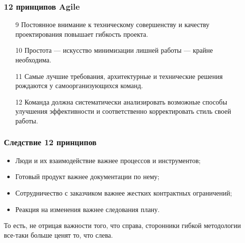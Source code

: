 \documentclass{../industrial-development}
\begin{document}
\lecturenotes

\begin{frame} \frametitle{12 принципов  Agile}
\begin{itemize}
\item[9] Постоянное внимание к техническому совершенству и качеству 
проектирования повышает гибкость проекта.
\item[10] Простота — искусство минимизации лишней работы — крайне необходима.
\item[11] Самые лучшие требования, архитектурные и технические решения рождаются 
у самоорганизующихся команд.
\item[12] Команда должна систематически анализировать возможные способы 
улучшения эффективности и соответственно корректировать  стиль своей работы.
\end{itemize}
\end{frame}

\begin{frame} \frametitle{Следствие 12 принципов}
\begin{itemize}
\item \alert{Люди и их взаимодействие}  важнее процессов и инструментов; 
\item \alert{Готовый продукт} важнее документации по нему; 
\item \alert{Сотрудничество с заказчиком} важнее жестких контрактных ограничений; 
\item \alert{Реакция на изменения} важнее следования плану.
\end{itemize}
\begin{block}{}
То есть, не отрицая важности того, что справа, сторонники гибкой методологии все-таки больше ценят то, что слева.
\end{block}
\end{frame}
\end{document}
